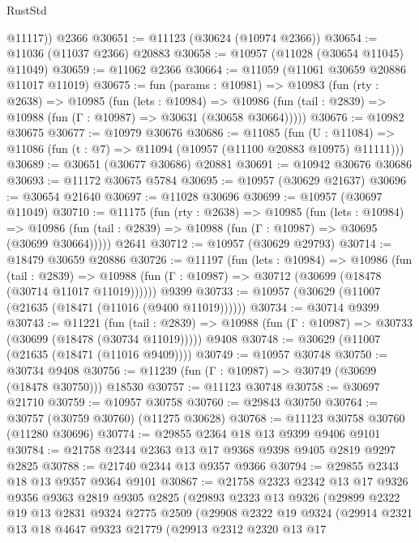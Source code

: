 \begin{lexlean}{RustStd}
\begin{coremodule}
        @11117))
    @2366
@30651 := @11123 (@30624 (@10974 @2366))
@30654 := @11036 (@11037 @2366) @20883
@30658 := @10957 (@11028 (@30654 @11045) @11049)
@30659 := @11062 @2366
@30664 := @11059 (@11061 @30659 @20886 @11017 @11019)
@30675 := fun (params : @10981) =>
  @10983
    (fun (rty : @2638) =>
    @10985
      (fun (lets : @10984) =>
      @10986 (fun (tail : @2839) => @10988 (fun (Γ : @10987) => @30631 (@30658 @30664)))))
@30676 := @10982 @30675
@30677 := @10979 @30676
@30686 := @11085
    (fun (U : @11084) => @11086 (fun (t : @7) => @11094 (@10957 (@11100 @20883 @10975) @11111)))
@30689 := @30651 (@30677 @30686) @20881
@30691 := @10942 @30676 @30686
@30693 := @11172 @30675 @5784
@30695 := @10957 (@30629 @21637)
@30696 := @30654 @21640
@30697 := @11028 @30696
@30699 := @10957 (@30697 @11049)
@30710 := @11175
    (fun (rty : @2638) =>
    @10985
      (fun (lets : @10984) =>
      @10986 (fun (tail : @2839) => @10988 (fun (Γ : @10987) => @30695 (@30699 @30664)))))
    @2641
@30712 := @10957 (@30629 @29793)
@30714 := @18479 @30659 @20886
@30726 := @11197
    (fun (lets : @10984) =>
    @10986
      (fun (tail : @2839) =>
      @10988 (fun (Γ : @10987) => @30712 (@30699 (@18478 (@30714 @11017 @11019))))))
    @9399
@30733 := @10957 (@30629 (@11007 (@21635 (@18471 (@11016 (@9400 @11019))))))
@30734 := @30714 @9399
@30743 := @11221
    (fun (tail : @2839) => @10988 (fun (Γ : @10987) => @30733 (@30699 (@18478 (@30734 @11019)))))
    @9408
@30748 := @30629 (@11007 (@21635 (@18471 (@11016 @9409))))
@30749 := @10957 @30748
@30750 := @30734 @9408
@30756 := @11239 (fun (Γ : @10987) => @30749 (@30699 (@18478 @30750))) @18530
@30757 := @11123 @30748
@30758 := @30697 @21710
@30759 := @10957 @30758
@30760 := @29843 @30750
@30764 := @30757 (@30759 @30760) (@11275 @30628)
@30768 := @11123 @30758 @30760 (@11280 @30696)
@30774 := @29855 @2364 @18 @13 @9399 @9406 @9101
@30784 := @21758 @2344 @2363 @13 @17 @9368 @9398 @9405 @2819 @9297 @2825
@30788 := @21740 @2344 @13 @9357 @9366
@30794 := @29855 @2343 @18 @13 @9357 @9364 @9101
@30867 := @21758
    @2323
    @2342
    @13
    @17
    @9326
    @9356
    @9363
    @2819
    @9305
    @2825
    (@29893
      @2323
      @13
      @9326
      (@29899
        @2322
        @19
        @13
        @2831
        @9324
        @2775
        @2509
        (@29908
          @2322
          @19
          @9324
          (@29914
            @2321
            @13
            @18
            @4647
            @9323
            @21779
            (@29913
              @2312
              @2320
              @13
              @17

\end{coremodule}
\end{lexlean}

